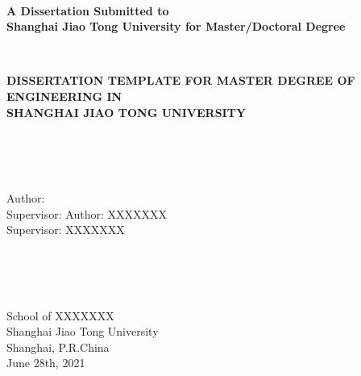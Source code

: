 \newpage
\thispagestyle{empty}
~\\
\begin{center}
\textbf{
A Dissertation Submitted to \\
Shanghai Jiao Tong University for Master/Doctoral Degree}
\end{center}
~\\
\begin{center}
\textbf{
DISSERTATION TEMPLATE FOR MASTER DEGREE OF ENGINEERING IN \\
SHANGHAI JIAO TONG UNIVERSITY}
\end{center}
~\\
~\\
~\\
\begin{center}
\ifreview
Author:  \\   %
Supervisor:    %
\else
Author:  XXXXXXX\\
Supervisor:   XXXXXXX
\fi
\end{center}
~\\
~\\
~\\
\begin{center}
School of XXXXXXX \\
Shanghai Jiao Tong University \\
Shanghai, P.R.China \\
June 28th, 2021  
\end{center}

\newpage